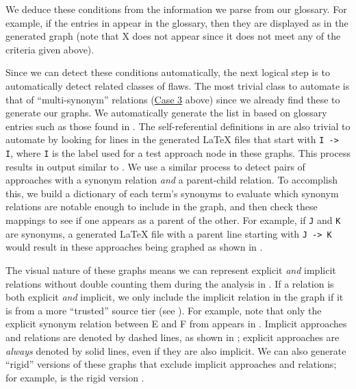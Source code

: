     We deduce these conditions from the information we parse from our
    glossary. For example, if the entries in 
    appear in the glossary, then they are displayed as 
    in the generated graph (note that X does not appear since it does not
    meet any of the criteria given above).

    Since we can detect these conditions automatically, the next logical step
    is to automatically detect related classes of flaws. The most trivial class
    to automate is that of ``multi-synonym'' relations
    (\hyperref[case-three]{Case 3} above) since we already find these to
    generate our graphs. We automatically generate the list in 
    based on glossary entries such as those found in
    . The self-referential definitions in
     are also trivial to automate by looking for lines in the
    generated \LaTeX{} files that start with \texttt{I -> I}, where \texttt{I}
    is the label used for a test approach node in these graphs. This process
    results in output similar to . We use a similar
    process to detect pairs of approaches with a synonym relation \emph{and} a
    parent-child relation. To accomplish this, we build a dictionary of each
    term's synonyms to evaluate which synonym relations are notable enough to
    include in the graph, and then check these mappings to see if one appears
    as a parent of the other. For example, if \texttt{J} and \texttt{K} are
    synonyms, a generated \LaTeX{} file with a parent line starting with
    \texttt{J -> K} would result in these approaches being graphed as shown in
    .

    \label{expAndImp}
    The visual nature of these graphs means we can represent explicit
    \emph{and} implicit relations without double counting them during the
    analysis in . If a relation is both explicit
    \emph{and} implicit, we only include the implicit relation in the graph
    if it is from a more ``trusted'' source tier (see ).
    For example, note that only the explicit synonym relation between E and F
    from  appears in .
    Implicit approaches and relations are denoted by dashed lines, as shown
    in ; explicit approaches are
    \emph{always} denoted by solid lines, even if they are also implicit.
    We can also generate ``rigid'' versions of these graphs that exclude
    implicit approaches and relations; for example,
     is the rigid version .

